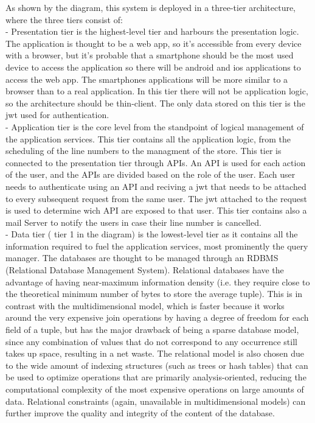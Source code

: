 As shown by the diagram, this system is deployed in a three-tier
architecture, where the three tiers consist of: \\
- Presentation tier is the highest-level tier and harbours the presentation logic.
The application is thought to be a web app, so it's accessible from every device with a browser, but it's probable that
a smartphone should be the most used device to access the application so there will be android and ios applications to access
the web app.
The smartphones applications will be more similar to a browser than to a real application.
In this tier there will not be application logic, so the architecture should be thin-client.
The only data stored on this tier is the jwt used for authentication. \\
- Application tier is the core level from the standpoint of logical management of the application services.
This tier contains all the application logic, from the scheduling of the line numbers to the managment of the store.
This tier is connected to the presentation tier through APIs.
An API is used for each action of the user, and the APIs are divided based on the role of the user.
Each user needs to authenticate using an API and reciving a jwt that needs to be attached to every subsequent request from the same user.
The jwt attached to the request is used to determine wich API are exposed to that user.
This tier contains also a mail Server to notify the users in case their line number is cancelled. \\

- Data tier ( tier 1 in the diagram) is the lowest-level tier as it contains all the information required to fuel the
application services, most prominently the query manager. The
databases are thought to be managed through an RDBMS
(Relational Database Management System). Relational databases
have the advantage of having near-maximum information density
(i.e. they require close to the theoretical minimum number of bytes
to store the average tuple). This is in contrast with the
multidimensional model, which is faster because it works around the
very expensive join operations by having a degree of freedom for
each field of a tuple, but has the major drawback of being a sparse
database model, since any combination of values that do not
correspond to any occurrence still takes up space, resulting in a net
waste. The relational model is also chosen due to the wide amount of
indexing structures (such as trees or hash tables) that can be used to
optimize operations that are primarily analysis-oriented, reducing
the computational complexity of the most expensive operations on
large amounts of data. Relational constraints (again, unavailable in
multidimensional models) can further improve the quality and
integrity of the content of the database.

